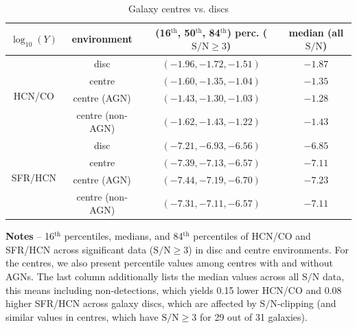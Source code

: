 \documentclass[letter, longauth]{aa} %
\newcommand*{\snr}{\ensuremath{\mathrm{S}/\mathrm{N}}\xspace}  %
\begin{document}
\begin{appendix}
\begin{table}
\begin{center}
\caption{Galaxy centres vs. discs}
\label{tab:centres}
\begin{tabular}{cccc}
\hline \hline
$\log_{10}(Y)$ &  environment & (16$^\mathrm{th}$, 50$^\mathrm{th}$, 84$^\mathrm{th}$) perc. ($\snr\geq 3$) & median (all \snr) \\
\hline
\multirow{4}{*}{HCN/CO}  &         disc     & $(-1.96,-1.72,-1.51)$ & $-1.87$ \\
                         &       centre     & $(-1.60,-1.35,-1.04)$ & $-1.35$ \\
                         & centre (AGN)     & $(-1.43,-1.30,-1.03)$ & $-1.28$ \\
                         & centre (non-AGN) & $(-1.62,-1.43,-1.22)$ & $-1.43$ \\
\hline
\multirow{4}{*}{SFR/HCN} &         disc     & $(-7.21,-6.93,-6.56)$ & $-6.85$ \\
                         &       centre     & $(-7.39,-7.13,-6.57)$ & $-7.11$ \\
                         & centre (AGN)     & $(-7.44,-7.19,-6.70)$ & $-7.23$ \\
                         & centre (non-AGN) & $(-7.31,-7.11,-6.57)$ & $-7.11$ \\
                         
\hline\hline
\end{tabular}
\end{center}
{\bf Notes} --
16$^\mathrm{th}$ percentiles, medians, and 84$^\mathrm{th}$ percentiles of HCN/CO and SFR/HCN across significant data ($\snr\geq 3$) in disc and centre environments.
For the centres, we also present percentile values among centres with and without AGNs.
The last column additionally lists the median values across all \snr data, this means including non-detections, which yields \SI{0.15}{\dex} lower HCN/CO and \SI{0.08}{\dex} higher SFR/HCN across galaxy discs, which are affected by \snr-clipping (and similar values in centres, which have $\snr\geq 3$ for 29 out of 31 galaxies).
\end{table}

\end{appendix}
\end{document}
